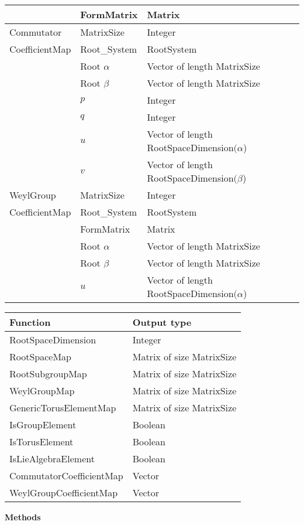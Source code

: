 \documentclass[12pt]{article}
\theoremstyle{definition}
\numberwithin{theorem}{subsection}
\newcommand{\tbf}{\textbf}
\begin{document}
\begin{center}
\begin{tabular}{l|l|l}
		& FormMatrix & Matrix \\
		\hline
		Commutator & MatrixSize & Integer \\
		CoefficientMap & Root\_System & RootSystem \\
		& Root $\alpha$ & Vector of length MatrixSize \\
		& Root $\beta$ & Vector of length MatrixSize \\
		& $p$ & Integer \\
		& $q$ & Integer \\
		& $u$ & Vector of length RootSpaceDimension$(\alpha$) \\
		& $v$ & Vector of length RootSpaceDimension$(\beta$) \\
		\hline
		WeylGroup & MatrixSize & Integer \\
		CoefficientMap & Root\_System & RootSystem \\
		& FormMatrix & Matrix \\
		& Root $\alpha$ & Vector of length MatrixSize \\
		& Root $\beta$ & Vector of length MatrixSize \\
		& $u$ & Vector of length RootSpaceDimension$(\alpha$) \\
	\end{tabular}
\end{center}

\newpage
\begin{center}
	\begin{tabular}{l|l}
		Function & Output type \\
		\hline
		RootSpaceDimension & Integer \\
		RootSpaceMap & Matrix of size MatrixSize \\
		RootSubgroupMap & Matrix of size MatrixSize \\
		WeylGroupMap &  Matrix of size MatrixSize \\
		GenericTorusElementMap & Matrix of size MatrixSize \\
		IsGroupElement & Boolean \\
		IsTorusElement & Boolean \\
		IsLieAlgebraElement & Boolean \\
		CommutatorCoefficientMap & Vector \\
		WeylGroupCoefficientMap & Vector
	\end{tabular}
\end{center}

\begin{center}
\tbf{Methods}
\end{center}
\end{document}
